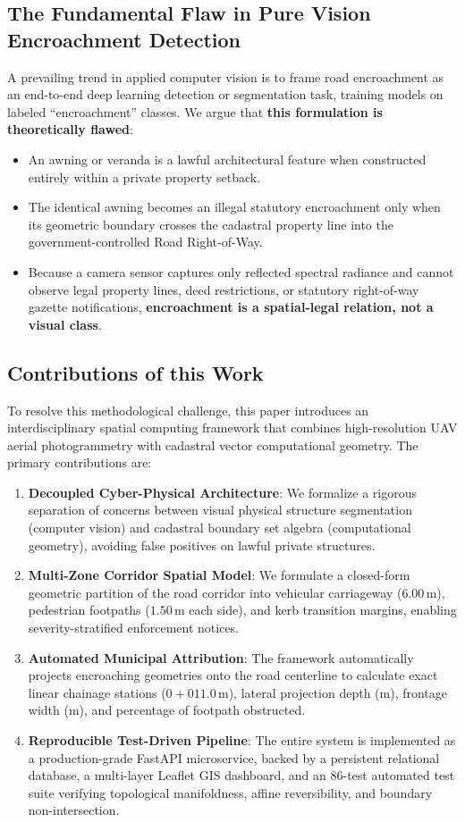 \documentclass[conference]{IEEEtran}
\begin{document}
\subsection{The Fundamental Flaw in Pure Vision Encroachment Detection}
A prevailing trend in applied computer vision is to frame road encroachment as an end-to-end deep learning detection or segmentation task, training models on labeled ``encroachment'' classes. We argue that \textbf{this formulation is theoretically flawed}:
\begin{itemize}
    \item An awning or veranda is a lawful architectural feature when constructed entirely within a private property setback.
    \item The identical awning becomes an illegal statutory encroachment only when its geometric boundary crosses the cadastral property line into the government-controlled Road Right-of-Way.
    \item Because a camera sensor captures only reflected spectral radiance and cannot observe legal property lines, deed restrictions, or statutory right-of-way gazette notifications, \textbf{encroachment is a spatial-legal relation, not a visual class}.
\end{itemize}

\subsection{Contributions of this Work}
To resolve this methodological challenge, this paper introduces an interdisciplinary spatial computing framework that combines high-resolution UAV aerial photogrammetry with cadastral vector computational geometry. The primary contributions are:
\begin{enumerate}
    \item \textbf{Decoupled Cyber-Physical Architecture}: We formalize a rigorous separation of concerns between visual physical structure segmentation (computer vision) and cadastral boundary set algebra (computational geometry), avoiding false positives on lawful private structures.
    \item \textbf{Multi-Zone Corridor Spatial Model}: We formulate a closed-form geometric partition of the road corridor into vehicular carriageway ($6.00\,\text{m}$), pedestrian footpaths ($1.50\,\text{m}$ each side), and kerb transition margins, enabling severity-stratified enforcement notices.
    \item \textbf{Automated Municipal Attribution}: The framework automatically projects encroaching geometries onto the road centerline to calculate exact linear chainage stations ($0+011.0\,\text{m}$), lateral projection depth ($\text{m}$), frontage width ($\text{m}$), and percentage of footpath obstructed.
    \item \textbf{Reproducible Test-Driven Pipeline}: The entire system is implemented as a production-grade FastAPI microservice, backed by a persistent relational database, a multi-layer Leaflet GIS dashboard, and an 86-test automated test suite verifying topological manifoldness, affine reversibility, and boundary non-intersection.
\end{enumerate}
\end{document}
